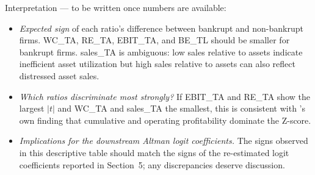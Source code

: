 \documentclass[11pt,a4paper]{article}
\begin{document}
Interpretation --- to be written once numbers are available:
\begin{itemize}
\item \textit{Expected sign} of each ratio's difference between bankrupt and
non-bankrupt firms. WC\_TA, RE\_TA, EBIT\_TA, and BE\_TL should be smaller
for bankrupt firms. sales\_TA is ambiguous: low sales relative to assets
indicate inefficient asset utilization but high sales relative to assets can
also reflect distressed asset sales.
\item \textit{Which ratios discriminate most strongly?} If EBIT\_TA and
RE\_TA show the largest $|t|$ and WC\_TA and sales\_TA the smallest, this
is consistent with \cite{altman1968}'s own finding that cumulative and
operating profitability dominate the Z-score.
\item \textit{Implications for the downstream Altman logit coefficients.}
The signs observed in this descriptive table should match the signs of the
re-estimated logit coefficients reported in Section~5; any discrepancies
deserve discussion.
\end{itemize}

\end{document}
